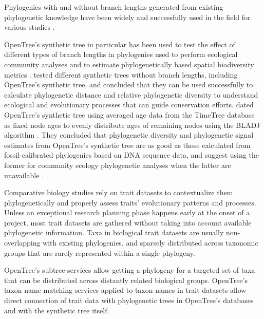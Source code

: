 \documentclass[oupdraft]{sysbio_sse}
\begin{document}
Phylogenies with and without branch lengths generated from
existing phylogenetic knowledge have been widely and successfully used in the field
for various studies \citep{webb2005phylomatic, allen2019spatial}.

OpenTree's synthetic tree in particular has been used to test the effect of
different types of branch lengths in phylogenies used to perform ecological community
analyses and to estimate phylogenetically based spatial biodiversity metrics
\citep{allen2019spatial, li2019common}.
\citep{allen2019spatial} tested different synthetic trees without branch lengths,
including OpenTree's synthetic tree, and concluded that they can be used successfully
to calculate phylogenetic distance and relative phylogenetic diversity to understand
ecological and evolutionary processes that can guide conservation efforts.
\citep{li2019common} dated OpenTree's synthetic tree using averaged age data from
the TimeTree database \citep{kumar2017timetree} as fixed node ages to evenly distribute ages of remaining
nodes using the BLADJ algorithm \citep{webb2008phylocom}. They concluded that phylogenetic diversity
and phylogenetic signal estimates from OpenTree's synthetic tree are as good
as those calculated from fossil-calibrated phylogenies based on DNA sequence data,
and suggest using the former for community ecology phylogenetic analyses when the
latter are unavailable \citep{li2019common}.

Comparative biology studies rely on trait datasets to contextualize them phylogenetically
and properly assess traits' evolutionary patterns and processes.
Unless an exceptional research planning phase happens early at the onset of a project,
most trait datasets are gathered without taking into account available phylogenetic information.
Taxa in biological trait datasets are usually non-overlapping with existing phylogenies,
and sparsely distributed across taxonomic groups that are rarely represented within
a single phylogeny.

OpenTree's subtree services allow getting a phylogeny for a targeted set of taxa
that can be distributed across distantly related biological groups.
OpenTree's taxon name matching services applied to taxon names in trait datasets
allow direct connection of trait data with phylogenetic trees in OpenTree's databases
and with the synthetic tree itself.
\end{document}

